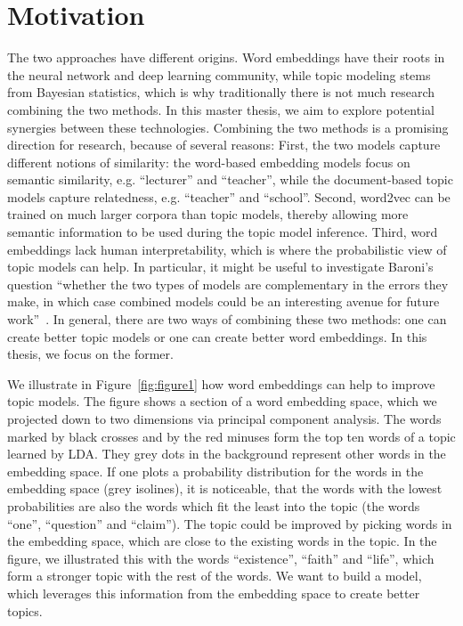 \documentclass[
        a4paper,
        titlepage,
        twoside,
        parskip,
        numbers=noenddot
        ]{scrbook}
\theoremstyle{break}
\begin{document}
\section{Motivation}
The two approaches have different origins.
Word embeddings have their roots in the neural network and deep learning community, while topic modeling stems from Bayesian statistics, which is why traditionally there is not much research combining the two methods.
In this master thesis, we aim to explore potential synergies between these technologies.
Combining the two methods is a promising direction for research, because of several reasons:
First, the two models capture different notions of similarity: the word-based embedding models focus on semantic similarity, e.g. ``lecturer'' and ``teacher'', while the document-based topic models capture relatedness, e.g. ``teacher'' and ``school''.
Second, word2vec can be trained on much larger corpora than topic models, thereby allowing more semantic information to be used during the topic model inference.
Third, word embeddings lack human interpretability, which is where the probabilistic view of topic models can help.
In particular, it might be useful to investigate Baroni's question ``whether the two types of models are complementary in the errors they make, in which case combined models could be an interesting avenue for future work''~\cite{Baroni2014}.
In general, there are two ways of combining these two methods: one can create better topic models or one can create better word embeddings.
In this thesis, we focus on the former.

We illustrate in Figure~\ref{fig:figure1} how word embeddings can help to improve topic models.
The figure shows a section of a word embedding space, which we projected down to two dimensions via principal component analysis.
The words marked by black crosses and by the red minuses form the top ten words of a topic learned by LDA.
They grey dots in the background represent other words in the embedding space.
If one plots a probability distribution for the words in the embedding space (grey isolines), it is noticeable, that the words with the lowest probabilities are also the words which fit the least into the topic (the words ``one'', ``question'' and ``claim'').
The topic could be improved by picking words in the embedding space, which are close to the existing words in the topic.
In the figure, we illustrated this with the words ``existence'', ``faith'' and ``life'', which form a stronger topic with the rest of the words.
We want to build a model, which leverages this information from the embedding space to create better topics.
\end{document}
